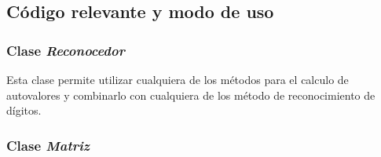 \subsection{C\'odigo relevante y modo de uso}

	\subsubsection{Clase \textit{Reconocedor}}
		Esta clase permite utilizar cualquiera de los m\'etodos para el calculo
		de autovalores y combinarlo con cualquiera de los m\'etodo de reconocimiento
		de d\'igitos.
		
		

	\subsubsection{Clase \textit{Matriz}}

		
